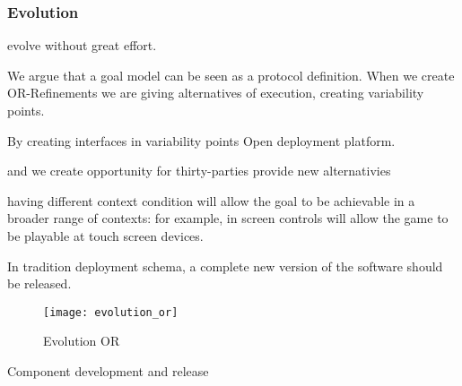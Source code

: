 \subsubsection{Evolution}

evolve without great effort.

We argue that a goal model can be seen as a protocol definition. When we create OR-Refinements we are giving alternatives of execution, creating variability points.

By creating interfaces in variability points
Open deployment platform.

  and we create opportunity for thirty-parties provide new alternativies

having different context condition will allow the goal to be achievable in a broader range of contexts: for example, in screen controls will allow the game to be playable at touch screen devices.

In tradition deployment schema, a complete new version of the software should be released.

\begin{figure}[!htb]
  \centering
  \texttt{[image: evolution\_or]}
  \caption{Evolution OR}
\label{fig:evolution_or}
\end{figure}

Component development and release
